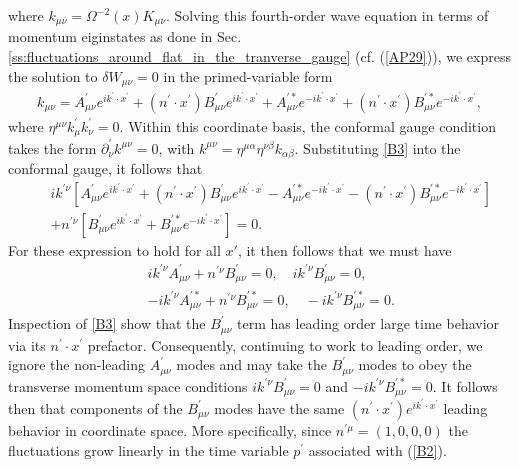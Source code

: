 %
where $k_{\mu\nu}=\Omega^{-2}(x)K_{\mu\nu}$. Solving this fourth-order wave equation in terms of momentum eiginstates as done in Sec. \ref{ss:fluctuations_around_flat_in_the_tranverse_gauge} (cf. (\ref{AP29})), we express the solution to $\delta W_{\mu\nu}=0$ in the primed-variable form
%
\begin{eqnarray}
k_{\mu\nu}=A^{\prime}_{\mu\nu}e^{ik^{\prime}\cdot x^{\prime}}+(n^{\prime}\cdot x^{\prime})B^{\prime}_{\mu\nu}e^{ik^{\prime}\cdot x^{\prime}}+A^{\prime *}_{\mu\nu}e^{-ik^{\prime}\cdot x^{\prime}}+(n^{\prime}\cdot x^{\prime})B^{\prime *}_{\mu\nu}e^{-ik^{\prime}\cdot x^{\prime}},
\label{B3}
\end{eqnarray}
%
where $\eta^{\mu\nu}k^{\prime}_{\mu}k^{\prime}_{\nu}=0$. Within this coordinate basis, the conformal gauge condition takes the form $\partial^{\prime}_{\nu}k^{\mu\nu}=0$, with $k^{\mu\nu}=\eta^{\mu\alpha}\eta^{\nu\beta}k_{\alpha\beta}$. Substituting \eqref{B3} into the conformal gauge, it follows that
%
\begin{eqnarray}
&&ik^{\prime \nu}\left[A^{\prime}_{\mu\nu}e^{ik^{\prime}\cdot x^{\prime}}+(n^{\prime}\cdot x^{\prime})B^{\prime}_{\mu\nu}e^{ik^{\prime}\cdot x^{\prime}}-A^{\prime *}_{\mu\nu}e^{-ik^{\prime}\cdot x^{\prime}}-(n^{\prime}\cdot x^{\prime})B^{\prime *}_{\mu\nu}e^{-ik^{\prime}\cdot x^{\prime}}\right]
\nonumber\\
&&+n^{\prime\nu}\left[B^{\prime}_{\mu\nu}e^{ik^{\prime}\cdot x^{\prime}}+B^{\prime *}_{\mu\nu}e^{-ik^{\prime}\cdot x^{\prime}}\right]=0.
\label{B4}
\end{eqnarray}
%
For these expression to hold for all $x'$, it then follows that we must have
%
\begin{eqnarray}
&&ik^{\prime \nu}A^{\prime}_{\mu\nu}+n^{ \prime\nu}B^{\prime}_{\mu\nu}=0,\quad ik^{\prime \nu}B^{\prime}_{\mu\nu}=0, 
\nonumber\\
&&
-ik^{\prime \nu}A^{\prime *}_{\mu\nu}+n^{ \prime\nu}B^{\prime *}_{\mu\nu}=0,\quad -ik^{\prime \nu}B^{\prime *}_{\mu\nu}=0.
\label{B5}
\end{eqnarray}
%
Inspection of \eqref{B3} show that the $B^{\prime}_{\mu\nu}$ term has leading order large time behavior via its $n^{\prime}\cdot x^{\prime}$ prefactor. Consequently, continuing to work to leading order, we ignore the non-leading $A^{\prime}_{\mu\nu}$ modes and may take the $B^{\prime}_{\mu\nu}$ modes to obey the transverse momentum space conditions $ik^{\prime \nu}B^{\prime}_{\mu\nu}=0$ and $-ik^{\prime \nu}B^{\prime *}_{\mu\nu}=0$. It follows then that components of the $B^{\prime}_{\mu\nu}$ modes have the same $(n^{\prime}\cdot x^{\prime})e^{ik^{\prime}\cdot x^{\prime}}$ leading behavior in coordinate space. More specifically, since $n^{\prime \mu}=(1,0,0,0)$ the fluctuations grow linearly in the time variable $p^{\prime}$ associated with (\ref{B2}).

